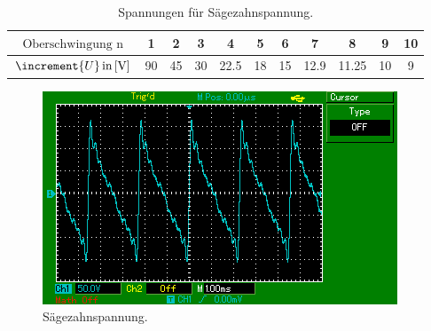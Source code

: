 \begin{table}[h]
  \centering
  \label{tab:6}
  \begin{tabular}{ c c c c c c c c c c c }
    \toprule
   $ \text{Oberschwingung n} $ & 1 &2 &  3 & 4& 5 &6& 7&8 & 9 & 10\\
    \midrule
   $\increment{U} \, \text{in\,[V]}$ &90& 45 & 30 & 22.5 &18 & 15 & 12.9 & 11.25 & 10 & 9 \\
    \bottomrule
  \end{tabular}
  \caption{Spannungen für Sägezahnspannung.}
\end{table}
\begin{figure}[H]
  \centering
  \includegraphics{content/images/saegezahn.png}
  \caption{Sägezahnspannung.}
  \label{fig:saeg}
\end{figure}
